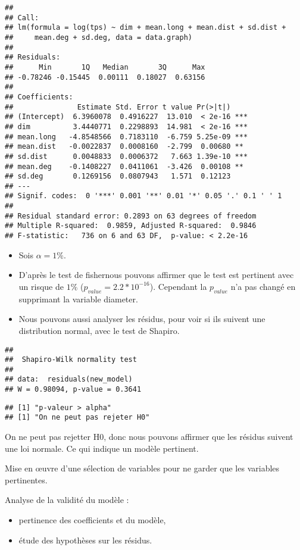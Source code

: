 \documentclass[
]{article}
\begin{document}
\begin{verbatim}
## 
## Call:
## lm(formula = log(tps) ~ dim + mean.long + mean.dist + sd.dist + 
##     mean.deg + sd.deg, data = data.graph)
## 
## Residuals:
##      Min       1Q   Median       3Q      Max 
## -0.78246 -0.15445  0.00111  0.18027  0.63156 
## 
## Coefficients:
##               Estimate Std. Error t value Pr(>|t|)    
## (Intercept)  6.3960078  0.4916227  13.010  < 2e-16 ***
## dim          3.4440771  0.2298893  14.981  < 2e-16 ***
## mean.long   -4.8548566  0.7183110  -6.759 5.25e-09 ***
## mean.dist   -0.0022837  0.0008160  -2.799  0.00680 ** 
## sd.dist      0.0048833  0.0006372   7.663 1.39e-10 ***
## mean.deg    -0.1408227  0.0411061  -3.426  0.00108 ** 
## sd.deg       0.1269156  0.0807943   1.571  0.12123    
## ---
## Signif. codes:  0 '***' 0.001 '**' 0.01 '*' 0.05 '.' 0.1 ' ' 1
## 
## Residual standard error: 0.2893 on 63 degrees of freedom
## Multiple R-squared:  0.9859, Adjusted R-squared:  0.9846 
## F-statistic:   736 on 6 and 63 DF,  p-value: < 2.2e-16
\end{verbatim}

\begin{itemize}
\item
  Sois \(\alpha = 1\%\).
\item
  D'après le test de fishernous pouvons affirmer que le test est
  pertinent avec un risque de \(1\%\) (\(p_{value} =2.2*10^{-16}\)).
  Cependant la \(p_{value}\) n'a pas changé en supprimant la variable
  diameter.
\item
  Nous pouvons aussi analyser les résidus, pour voir si ils suivent une
  distribution normal, avec le test de Shapiro.
\end{itemize}

\begin{verbatim}
## 
##  Shapiro-Wilk normality test
## 
## data:  residuals(new_model)
## W = 0.98094, p-value = 0.3641
\end{verbatim}

\begin{verbatim}
## [1] "p-valeur > alpha"
## [1] "On ne peut pas rejeter H0"
\end{verbatim}

On ne peut pas rejetter H0, donc nous pouvons affirmer que les résidus
suivent une loi normale. Ce qui indique un modèle pertinent.

Mise en \oe uvre d'une sélection de variables pour ne garder que les
variables pertinentes.

Analyse de la validité du modèle :

\begin{itemize}
\item
  pertinence des coefficients et du modèle,
\item
  étude des hypothèses sur les résidus.
\end{itemize}
\end{document}
